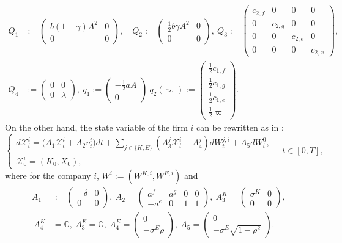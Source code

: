 \documentclass[11pt,twoside]{amsart}
\theoremstyle{definition}
\numberwithin{equation}{section}
\newcommand{\w}{\varpi}
\begin{document}
\begin{align*}
Q_1&:= 
\begin{pmatrix} 
b(1-\gamma) A^2 & 0 \\
0&0
\end{pmatrix},
\quad {Q}_2 :=
\begin{pmatrix} 
\frac{1}{2}b\gamma A^2 &0\\
0&0
\end{pmatrix},
\  Q_3:= 
\begin{pmatrix} 
c_{2,f} 	&0			&0			&0\\
0		&c_{2,g} 		&0			&0\\
0		&0			&c_{2,e}		&0\\
0		&0			&0			&c_{2,x}
\end{pmatrix},
\\
Q_4&:=
\begin{pmatrix}
 0&0\\
 0&\lambda
 \end{pmatrix} ,\ 
q_1 := 
\begin{pmatrix} 
-\frac{1}{2}aA \\
0
\end{pmatrix}
\  q_2(\w) := 
\begin{pmatrix}
\frac{1}{2}c_{1,f}\\
\frac{1}{2}c_{1,g}\\
\frac{1}{2}c_{1,e}\\
\frac{1}{2}\w
\end{pmatrix}.
\end{align*}
On the other hand, the state variable of the firm $i$ can be rewritten as in \cite{del2024mean}:
\begin{equation}
\label{eqn: state variable N}
\begin{cases}
d\mathcal{X}^i_t = \big( A_1 \mathcal{X}^i_t + A_2 v^i_t\big) dt + \sum_{j \in\{ K,E\}} (A^j_3\mathcal{X}^i_t+ A^j_4)dW^{j,i}_t + A_5dW^0_t,\\
\mathcal{X}^i_0 = (K_0,X_0),
\end{cases}\quad t\in[0,T],
\end{equation}
where for the company $i$, $W^i := (W^{K,i}, W^{E,i})$ and
\begin{align*}
A_1 &:= 
\begin{pmatrix}
-\delta	&0	\\
0		&0	
\end{pmatrix},
\ 
A_2 = 
\begin{pmatrix} 
a^f	&a^g		&0	&0\\
-a^e	&0		&1	&1
\end{pmatrix},
\ A^K_3=
\begin{pmatrix} 
\sigma^K	&0	\\
0		&0
\end{pmatrix},\\
\ A^K_4 &= \mathds{O},
\ A^E_3 = \mathds{O}, \  A^E_4 = \begin{pmatrix}
0\\
-\sigma^E\rho
\end{pmatrix},\
A_5 = \begin{pmatrix}
0\\
-\sigma^E\sqrt{1-\rho^2}
\end{pmatrix}.
\end{align*}
\end{document}
